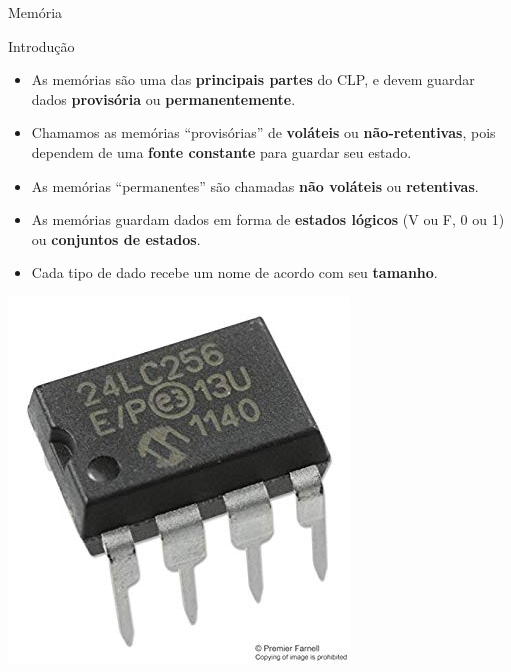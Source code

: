\begin{frame}{Memória}
	\begin{block}{Introdução}
		\begin{itemize}
			\item As memórias são uma das \textbf{principais partes} do CLP, e devem guardar dados \textbf{provisória} ou \textbf{permanentemente}.
			\item Chamamos as memórias ``provisórias'' de \textbf{voláteis} ou \textbf{não-retentivas}, pois dependem de uma \textbf{fonte constante} para guardar seu estado.
			\item As memórias ``permanentes'' são chamadas \textbf{não voláteis} ou \textbf{retentivas}.
			\item As memórias guardam dados em forma de \textbf{estados lógicos} (V ou F, 0 ou 1) ou \textbf{conjuntos de estados}. 
			\item Cada tipo de dado recebe um nome de acordo com seu \textbf{tamanho}.
		\end{itemize}
	\end{block}
	
	\centering
	
	\includegraphics[height=0.3\textheight]{Figuras/Ch08/fig10}
	
\end{frame}


